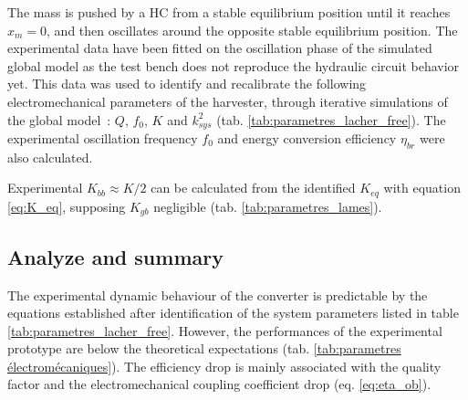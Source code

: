 \documentclass[3p,twocolumn,preprint]{elsarticle}
\begin{document}
The mass is pushed by a HC from a stable equilibrium position until it reaches \mbox{$x_m=0$}, and then oscillates around the opposite stable equilibrium position. The experimental data have been fitted on the oscillation phase of the simulated global model as the test bench does not reproduce the hydraulic circuit behavior yet. This data was used to identify and recalibrate the following electromechanical parameters of the harvester, through iterative simulations of the global \mbox{model :} $Q$, $f_0$, $K$ and $k_{sys}^2$ (tab. \ref{tab:parametres_lacher_free}).  The experimental oscillation frequency $f_0$ and energy conversion efficiency $\eta_{br}$ were also calculated.
\begin{table}[!htbp]
\centering
\captionsetup{justification=centering}
	\caption{Theoretical and experimentally recalibrated values of the electromechanical converter.}
	\label{tab:parametres_lacher_free}
\end{table}  

Experimental $K_{bb}\approx K/2$ can be calculated from the identified $K_{eq}$ with equation \ref{eq:K_eq}, supposing $K_{gb}$ negligible (tab. \ref{tab:parametres_lames}).
	\subsection{Analyze and summary}	
	\label{subsec:Analyze and summary}
The experimental dynamic behaviour of the converter is predictable by the equations established after identification of the system parameters listed in table \ref{tab:parametres_lacher_free}. However, the performances of the experimental prototype are below the theoretical expectations (tab. \ref{tab:parametres électromécaniques}). The efficiency drop is mainly associated with the quality factor and the electromechanical coupling coefficient drop (eq. \ref{eq:eta_ob}). 
\end{document}

